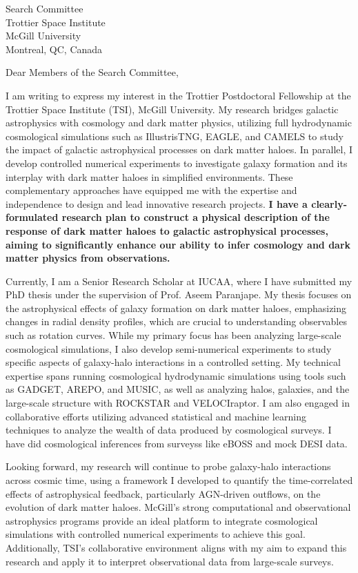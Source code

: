 \documentclass[11pt]{letter}
\begin{document}
\begin{letter}{Search Committee \\ Trottier Space Institute \\ McGill University \\ Montreal, QC, Canada}

\opening{Dear Members of the Search Committee,}

I am writing to express my interest in the Trottier Postdoctoral Fellowship at the Trottier Space Institute (TSI), McGill University. My research bridges galactic astrophysics with cosmology and dark matter physics, utilizing full hydrodynamic cosmological simulations such as IllustrisTNG, EAGLE, and CAMELS to study the impact of galactic astrophysical processes on dark matter haloes. In parallel, I develop controlled numerical experiments to investigate galaxy formation and its interplay with dark matter haloes in simplified environments. These complementary approaches have equipped me with the expertise and independence to design and lead innovative research projects. \textbf{I have a clearly-formulated research plan to construct a physical description of the response of dark matter haloes to galactic astrophysical processes, aiming to significantly enhance our ability to infer cosmology and dark matter physics from observations.}

Currently, I am a Senior Research Scholar at IUCAA, where I have submitted my PhD thesis under the supervision of Prof. Aseem Paranjape. My thesis focuses on the astrophysical effects of galaxy formation on dark matter haloes, emphasizing changes in radial density profiles, which are crucial to understanding observables such as rotation curves. While my primary focus has been analyzing large-scale cosmological simulations, I also develop semi-numerical experiments to study specific aspects of galaxy-halo interactions in a controlled setting. My technical expertise spans running cosmological hydrodynamic simulations using tools such as GADGET, AREPO, and MUSIC, as well as analyzing halos, galaxies, and the large-scale structure with ROCKSTAR and VELOCIraptor. I am also engaged in collaborative efforts utilizing advanced statistical and machine learning techniques to analyze the wealth of data produced by cosmological surveys. I have did cosmological inferences from surveyss like eBOSS and mock DESI data.

Looking forward, my research will continue to probe galaxy-halo interactions across cosmic time, using a framework I developed to quantify the time-correlated effects of astrophysical feedback, particularly AGN-driven outflows, on the evolution of dark matter haloes. McGill's strong computational and observational astrophysics programs provide an ideal platform to integrate cosmological simulations with controlled numerical experiments to achieve this goal. Additionally, TSI's collaborative environment aligns with my aim to expand this research and apply it to interpret observational data from large-scale surveys.


\end{letter}
\end{document}
